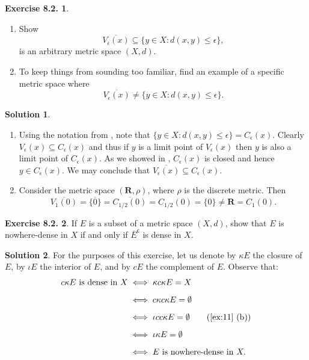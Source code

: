 \documentclass[12pt]{article}
\theoremstyle{definition}
\theoremstyle{exercise}
\newtheorem{exercise}{Exercise 8.2.}
\theoremstyle{solution}
\newtheorem*{solution}{Solution}
\newcommand{\setcomp}[1]{#1^{\mathsf{c}}}
\newcommand{\R}{\mathbf{R}}
\begin{document}
\begin{exercise}
\label{ex:12}
    \begin{enumerate}
        \item Show
        \[
            \overline{V_{\epsilon}(x)} \subseteq \{ y \in X : d(x, y) \leq \epsilon \},
        \]
        is an arbitrary metric space \( (X, d) \).

        \item To keep things from sounding too familiar, find an example of a specific metric space where
        \[
            \overline{V_{\epsilon}(x)} \neq \{ y \in X : d(x, y) \leq \epsilon \}.
        \]
    \end{enumerate}
\end{exercise}

\begin{solution}
    \begin{enumerate}
        \item Using the notation from , note that \( \{ y \in X : d(x, y) \leq \epsilon \} = C_{\epsilon}(x) \). Clearly \( V_{\epsilon}(x) \subseteq C_{\epsilon}(x) \) and thus if \( y \) is a limit point of \( V_{\epsilon}(x) \) then \( y \) is also a limit point of \( C_{\epsilon}(x) \). As we showed in , \( C_{\epsilon}(x) \) is closed and hence \( y \in C_{\epsilon}(x) \). We may conclude that \( \overline{V_{\epsilon}(x)} \subseteq C_{\epsilon}(x) \).

        \item Consider the metric space \( (\R, \rho) \), where \( \rho \) is the discrete metric. Then
        \[
            \overline{V_1(0)} = \overline{\{ 0 \}} = \overline{C_{1/2}(0)} = C_{1/2}(0) = \{ 0 \} \neq \R = C_1(0).
        \]
    \end{enumerate}
\end{solution}

\begin{exercise}
\label{ex:13}
    If \( E \) is a subset of a metric space \( (X, d) \), show that \( E \) is nowhere-dense in \( X \) if and only if \( \setcomp{\overline{E}} \) is dense in \( X \).
\end{exercise}

\begin{solution}
    For the purposes of this exercise, let us denote by \( \kappa E \) the closure of \( E \), by \( \iota E \) the interior of \( E \), and by \( c E \) the complement of \( E \). Observe that:
    \begin{align*}
        c \kappa E \text{ is dense in } X &\iff \kappa c \kappa E = X \\[2mm]
        &\iff c \kappa c \kappa E = \emptyset \\[2mm]
        &\iff \iota c c \kappa E = \emptyset \tag{\Cref{ex:11} (b)} \\[2mm]
        &\iff \iota \kappa E = \emptyset \\[2mm]
        &\iff E \text{ is nowhere-dense in } X.
    \end{align*}
\end{solution}
\end{document}

